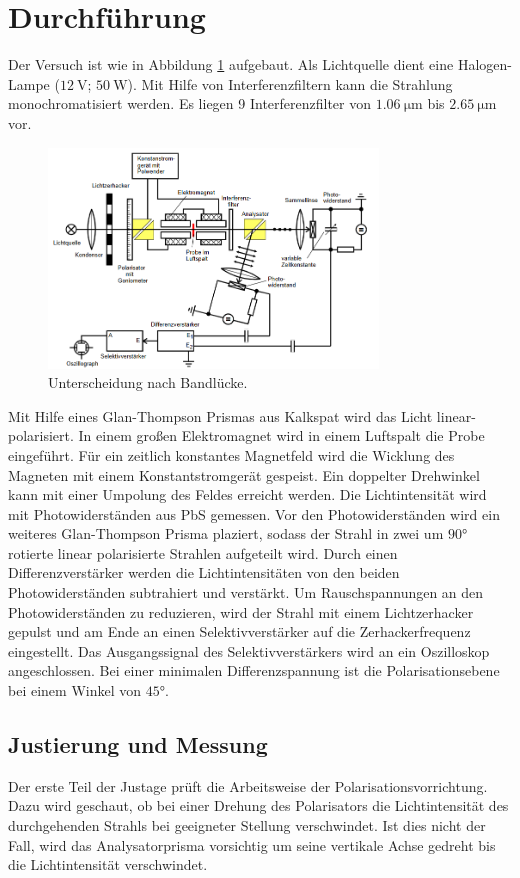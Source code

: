 \section{Durchführung}
\label{sec:Durchführung}
Der Versuch ist wie in Abbildung \ref{pic:aufbau} aufgebaut. 
Als Lichtquelle dient eine Halogen-Lampe ($\SI{12}{\volt}$; $\SI{50}{\watt}$).
Mit Hilfe von Interferenzfiltern kann die Strahlung monochromatisiert werden.
Es liegen 9 Interferenzfilter von $\SI{1.06}{\micro\meter}$ bis $\SI{2.65}{\micro\meter}$ vor.
\begin{figure}
    \centering
    \includegraphics[width = 0.78\textwidth]{pics/aufbau.png}
    \caption{Unterscheidung nach Bandlücke.\cite{Anleitung}}
    \label{pic:aufbau}
\end{figure}
Mit Hilfe eines Glan-Thompson Prismas aus Kalkspat wird das Licht linear-polarisiert. In einem großen Elektromagnet wird in einem Luftspalt die Probe eingeführt.
Für ein zeitlich konstantes Magnetfeld wird die Wicklung des Magneten mit einem Konstantstromgerät gespeist.
Ein doppelter Drehwinkel kann mit einer Umpolung des Feldes erreicht werden.
Die Lichtintensität wird mit Photowiderständen aus PbS gemessen. 
Vor den Photowiderständen wird ein weiteres Glan-Thompson Prisma plaziert, sodass der Strahl in zwei um $\ang{90}$ rotierte linear polarisierte Strahlen aufgeteilt wird.
Durch einen Differenzverstärker werden die Lichtintensitäten von den beiden Photowiderständen subtrahiert und verstärkt.
Um Rauschspannungen an den Photowiderständen zu reduzieren, wird der Strahl mit einem Lichtzerhacker
gepulst und am Ende an einen Selektivverstärker auf die Zerhackerfrequenz eingestellt.
Das Ausgangssignal des Selektivverstärkers wird an ein Oszilloskop angeschlossen.
Bei einer minimalen Differenzspannung ist die Polarisationsebene bei einem Winkel von $\ang{45}$. 

\subsection{Justierung und Messung}
Der erste Teil der Justage prüft die Arbeitsweise der Polarisationsvorrichtung. 
Dazu wird geschaut, ob bei einer Drehung des Polarisators die Lichtintensität des durchgehenden Strahls bei geeigneter Stellung verschwindet. 
Ist dies nicht der Fall, wird das Analysatorprisma vorsichtig um seine vertikale Achse gedreht bis die Lichtintensität verschwindet.

